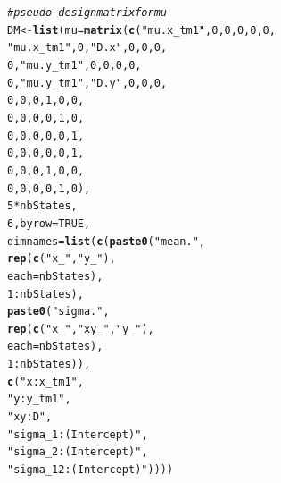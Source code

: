 \documentclass[12pt]{article}\usepackage[]{graphicx}\usepackage[]{color}
\makeatletter
\newcommand{\hlnum}[1]{\textcolor[rgb]{0.686,0.059,0.569}{#1}}%
\newcommand{\hlstr}[1]{\textcolor[rgb]{0.192,0.494,0.8}{#1}}%
\newcommand{\hlcom}[1]{\textcolor[rgb]{0.678,0.584,0.686}{\textit{#1}}}%
\newcommand{\hlopt}[1]{\textcolor[rgb]{0,0,0}{#1}}%
\newcommand{\hlstd}[1]{\textcolor[rgb]{0.345,0.345,0.345}{#1}}%
\newcommand{\hlkwb}[1]{\textcolor[rgb]{0.69,0.353,0.396}{#1}}%
\newcommand{\hlkwc}[1]{\textcolor[rgb]{0.333,0.667,0.333}{#1}}%
\newcommand{\hlkwd}[1]{\textcolor[rgb]{0.737,0.353,0.396}{\textbf{#1}}}%
\newenvironment{kframe}{%
 \def\at@end@of@kframe{}%
 \ifinner\ifhmode%
  \def\at@end@of@kframe{\end{minipage}}%
  \begin{minipage}{\columnwidth}%
 \fi\fi%
 \def\FrameCommand##1{\hskip\@totalleftmargin \hskip-\fboxsep
 \colorbox{shadecolor}{##1}\hskip-\fboxsep
     \hskip-\linewidth \hskip-\@totalleftmargin \hskip\columnwidth}%
 \MakeFramed {\advance\hsize-\width
   \@totalleftmargin\z@ \linewidth\hsize
   \@setminipage}}%
 {\par\unskip\endMakeFramed%
 \at@end@of@kframe}
\newenvironment{knitrout}{}{} %
\makeatother
\begin{document}
\begin{knitrout}
\begin{kframe}
\begin{alltt}
\hlcom{# pseudo-design matrix for mu}
\hlstd{DM} \hlkwb{<-} \hlkwd{list}\hlstd{(}\hlkwc{mu}\hlstd{=}\hlkwd{matrix}\hlstd{(}\hlkwd{c}\hlstd{(}\hlstr{"mu.x_tm1"}\hlstd{,}         \hlnum{0}\hlstd{,}    \hlnum{0}\hlstd{,}\hlnum{0}\hlstd{,}\hlnum{0}\hlstd{,}\hlnum{0}\hlstd{,}
                       \hlstr{"mu.x_tm1"}\hlstd{,}         \hlnum{0}\hlstd{,}\hlstr{"D.x"}\hlstd{,}\hlnum{0}\hlstd{,}\hlnum{0}\hlstd{,}\hlnum{0}\hlstd{,}
                                \hlnum{0}\hlstd{,}\hlstr{"mu.y_tm1"}\hlstd{,}    \hlnum{0}\hlstd{,}\hlnum{0}\hlstd{,}\hlnum{0}\hlstd{,}\hlnum{0}\hlstd{,}
                                \hlnum{0}\hlstd{,}\hlstr{"mu.y_tm1"}\hlstd{,}\hlstr{"D.y"}\hlstd{,}\hlnum{0}\hlstd{,}\hlnum{0}\hlstd{,}\hlnum{0}\hlstd{,}
                                \hlnum{0}\hlstd{,}         \hlnum{0}\hlstd{,}    \hlnum{0}\hlstd{,}\hlnum{1}\hlstd{,}\hlnum{0}\hlstd{,}\hlnum{0}\hlstd{,}
                                \hlnum{0}\hlstd{,}         \hlnum{0}\hlstd{,}    \hlnum{0}\hlstd{,}\hlnum{0}\hlstd{,}\hlnum{1}\hlstd{,}\hlnum{0}\hlstd{,}
                                \hlnum{0}\hlstd{,}         \hlnum{0}\hlstd{,}    \hlnum{0}\hlstd{,}\hlnum{0}\hlstd{,}\hlnum{0}\hlstd{,}\hlnum{1}\hlstd{,}
                                \hlnum{0}\hlstd{,}         \hlnum{0}\hlstd{,}    \hlnum{0}\hlstd{,}\hlnum{0}\hlstd{,}\hlnum{0}\hlstd{,}\hlnum{1}\hlstd{,}
                                \hlnum{0}\hlstd{,}         \hlnum{0}\hlstd{,}    \hlnum{0}\hlstd{,}\hlnum{1}\hlstd{,}\hlnum{0}\hlstd{,}\hlnum{0}\hlstd{,}
                                \hlnum{0}\hlstd{,}         \hlnum{0}\hlstd{,}    \hlnum{0}\hlstd{,}\hlnum{0}\hlstd{,}\hlnum{1}\hlstd{,}\hlnum{0}\hlstd{),}
                     \hlnum{5}\hlopt{*}\hlstd{nbStates,}
                     \hlnum{6}\hlstd{,}\hlkwc{byrow}\hlstd{=}\hlnum{TRUE}\hlstd{,}
                     \hlkwc{dimnames}\hlstd{=}\hlkwd{list}\hlstd{(}\hlkwd{c}\hlstd{(}\hlkwd{paste0}\hlstd{(}\hlstr{"mean."}\hlstd{,}
                                            \hlkwd{rep}\hlstd{(}\hlkwd{c}\hlstd{(}\hlstr{"x_"}\hlstd{,}\hlstr{"y_"}\hlstd{),}
                                                \hlkwc{each}\hlstd{=nbStates),}
                                            \hlnum{1}\hlopt{:}\hlstd{nbStates),}
                                     \hlkwd{paste0}\hlstd{(}\hlstr{"sigma."}\hlstd{,}
                                            \hlkwd{rep}\hlstd{(}\hlkwd{c}\hlstd{(}\hlstr{"x_"}\hlstd{,}\hlstr{"xy_"}\hlstd{,}\hlstr{"y_"}\hlstd{),}
                                                \hlkwc{each}\hlstd{=nbStates),}
                                            \hlnum{1}\hlopt{:}\hlstd{nbStates)),}
                                   \hlkwd{c}\hlstd{(}\hlstr{"x:x_tm1"}\hlstd{,}
                                     \hlstr{"y:y_tm1"}\hlstd{,}
                                     \hlstr{"xy:D"}\hlstd{,}
                                     \hlstr{"sigma_1:(Intercept)"}\hlstd{,}
                                     \hlstr{"sigma_2:(Intercept)"}\hlstd{,}
                                     \hlstr{"sigma_12:(Intercept)"}\hlstd{))))}


\end{alltt}
\end{kframe}
\end{knitrout}
\end{document}
